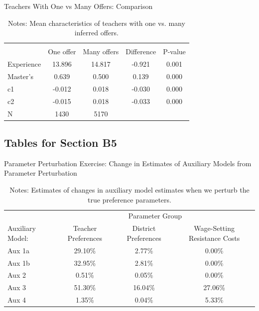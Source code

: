 \documentclass[notitlepage,12pt]{article}%
\begin{document}
\begin{table}
\caption{Teachers With One vs Many Offers: Comparison}
\label{tab:one_many_ff}
\begin{center}
\begin{tabular}{lcccc}
\hline\hline
                &\multicolumn{4}{c}{}                   \\
                &One offer&Many offers&Difference&  P-value\\
\hline
Experience      &   13.896&   14.817&   -0.921&    0.001\\
Master's        &    0.639&    0.500&    0.139&    0.000\\
c1              &   -0.012&    0.018&   -0.030&    0.000\\
c2              &   -0.015&    0.018&   -0.033&    0.000\\
\hline
N    &     1430&     5170  &         &         \\
\hline\hline
\end{tabular}
\caption*{{\footnotesize  Notes: Mean characteristics of teachers with one vs. many inferred offers.}}\end{center}
\end{table}

\pagebreak\clearpage


\subsection*{Tables for Section B5}

\begin{table}[h]
\caption{Parameter Perturbation Exercise: Change in Estimates of Auxiliary
Models from Parameter Perturbation}%
\label{tab:parameter_impact}
\begin{center}%
\begin{tabular}
[c]{lccc}\hline\hline
& \multicolumn{3}{c}{Parameter Group}\\\cline{2-4}%
Auxiliary Model: & Teacher Preferences & District Preferences & Wage-Setting
Resistance Costs\\\hline
Aux 1a & 29.10\% & 2.77\% & 0.00\%\\
Aux 1b & 32.95\% & 2.81\% & 0.00\%\\
Aux 2 & 0.51\% & 0.05\% & 0.00\%\\
Aux 3 & 51.30\% & 16.04\% & 27.06\%\\
Aux 4 & 1.35\% & 0.04\% & 5.33\%\\\hline\hline
\end{tabular}
\end{center}
\par
\caption*{{\footnotesize Notes: Estimates of changes in auxiliary model
estimates when we perturb the true preference parameters.}}\end{table}
\end{document}
